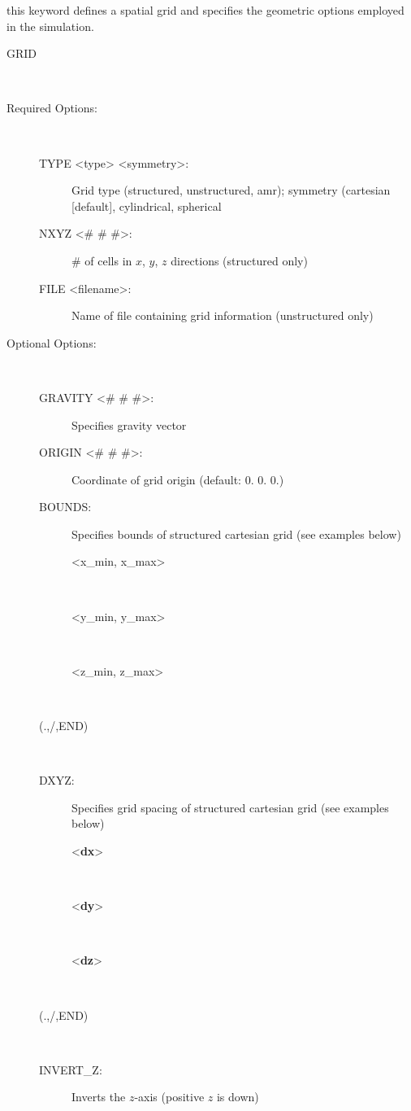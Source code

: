 \documentclass[12pt]{article}
\begin{document}
 this keyword defines a spatial grid and specifies the geometric options employed in the simulation.

\begin{description}
\item[GRID]~
\item[Required Options:]~

\begin{description}
\item[TYPE <type> <symmetry>:] Grid type (structured, unstructured, amr); symmetry (cartesian [default], cylindrical, spherical

\item[NXYZ <\# \# \#>:] \# of cells in $x$, $y$, $z$ directions (structured only)

\item[FILE <filename>:] Name of file containing grid information (unstructured only)
\end{description}

\item[Optional Options:] ~

\begin{description}

\item[GRAVITY <\# \# \#>:] Specifies gravity vector

\item[ORIGIN <\# \# \#>:] Coordinate of grid origin (default: 0. 0. 0.)

\item[BOUNDS:] Specifies bounds of structured cartesian grid (see examples below)
\begin{description}
\item[<x\_min, x\_max>]~
\item[<y\_min, y\_max>]~
\item[<z\_min, z\_max>]~
\end{description}
\item[(.,/,END)] ~

\item[DXYZ:] Specifies grid spacing of structured cartesian grid (see examples below)
\begin{description}
\item[<{\bf dx}>] ~
\item[<{\bf dy}>] ~
\item[<{\bf dz}>] ~
\end{description}
\item[(.,/,END)] ~

\item[INVERT\_Z:] Inverts the $z$-axis (positive $z$ is down)
\end{description}
\end{description}
\end{document}
